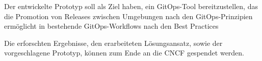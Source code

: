 Der entwickelte Prototyp soll als Ziel haben,
ein GitOps-Tool bereitzustellen,
das die Promotion von Releases zwischen Umgebungen
nach den GitOps-Prinzipien ermöglicht
in bestehende GitOps-Workflows nach 
den Best Practices
\bigskip

Die erforschten Ergebnisse,
den erarbeiteten Lösungsansatz,
sowie der vorgeschlagene Prototyp,
können zum Ende
an die CNCF gespendet werden.



















